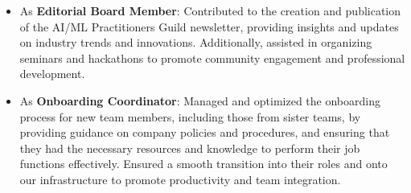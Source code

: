 \begin{itemize}
        \item As \textbf{Editorial Board Member}: Contributed to the creation and publication of the AI/ML Practitioners Guild newsletter, providing insights and updates on industry trends and innovations. Additionally, assisted in organizing seminars and hackathons to promote community engagement and professional development.
        \item As \textbf{Onboarding Coordinator}: Managed and optimized the onboarding process for new team members, including those from sister teams, by providing guidance on company policies and procedures, and ensuring that they had the necessary resources and knowledge to perform their job functions effectively. Ensured a smooth transition into their roles and onto our infrastructure to promote productivity and team integration.
    \end{itemize}